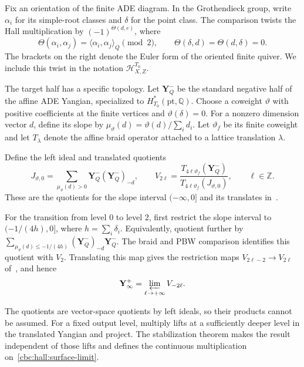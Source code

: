 Fix an orientation of the finite ADE diagram.
In the Grothendieck group, write $\alpha_i$ for its simple-root classes and $\delta$ for the point class.
The comparison twists the Hall multiplication by $(-1)^{\Theta(d,e)}$, where
\[
 \Theta(\alpha_i,\alpha_j)=\langle\alpha_i,\alpha_j\rangle_Q\pmod2,
 \qquad \Theta(\delta,d)=\Theta(d,\delta)=0.
\]
The brackets on the right denote the Euler form of the oriented finite quiver.
We include this twist in the notation $\mathcal H^{T_0}_{X,Z}$.

The target half has a specific topology.
Let $\mathbf Y_Q^-$ be the standard negative half of the affine ADE Yangian, specialized to $H^*_{T_0}(\mathrm{pt},\mathbb Q)$.
Choose a coweight $\vartheta$ with positive coefficients at the finite vertices and $\vartheta(\delta)=0$.
For a nonzero dimension vector $d$, define its slope by
$\mu_\vartheta(d)=\vartheta(d)/\sum_i d_i$.
Let $\vartheta_f$ be its finite coweight and let $T_\lambda$ denote the affine braid operator attached to a lattice translation $\lambda$.

Define the left ideal and translated quotients
\[
 J_{\vartheta,0}
   =\sum_{\mu_\vartheta(d)>0}\mathbf Y_Q^-(\mathbf Y_Q^-)_{-d},
 \qquad
 V_{2\ell}
   =\frac{T_{4\ell\vartheta_f}(\mathbf Y_Q^-)}
          {T_{4\ell\vartheta_f}(J_{\vartheta,0})},
 \qquad \ell\in\mathbb Z.
\]
These are the quotients for the slope interval $(-\infty,0]$ and its translates in~\cite[(III.3.6), \S III.7.4]{DPPSSV}.

For the transition from level $0$ to level $2$, first restrict the slope interval to $(-1/(4h),0]$, where $h=\sum_i\delta_i$.
Equivalently, quotient further by
$\sum_{\mu_\vartheta(d)\leq-1/(4h)}(\mathbf Y_Q^-)_{-d}\mathbf Y_Q^-$.
The braid and PBW comparison identifies this quotient with $V_2$.
Translating this map gives the restriction maps $V_{2\ell-2}\to V_{2\ell}$ of~\cite[(III.7.4)]{DPPSSV}, and hence
\begin{equation}\label{cbc:hall:surface-limit}
 \mathbf Y^+_\infty=\varprojlim_{\ell\to+\infty}V_{-2\ell}.
\end{equation}

The quotients are vector-space quotients by left ideals, so their products cannot be assumed.
For a fixed output level, multiply lifts at a sufficiently deeper level in the translated Yangian and project.
The stabilization theorem makes the result independent of those lifts and defines the continuous multiplication on~\eqref{cbc:hall:surface-limit}.

